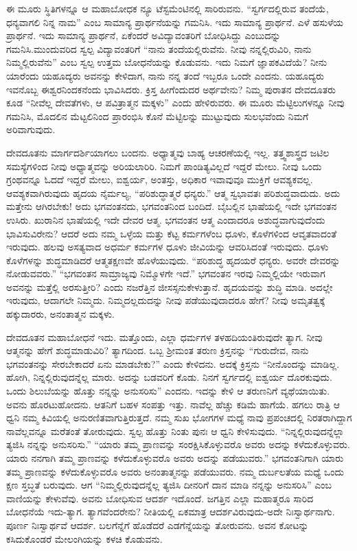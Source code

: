 ಈ ಮೂರು ಸ್ಥಿತಿಗಳನ್ನೂ ಆ ಮಹಾಬೋಧಕ ನ್ಯೂ ಟೆಸ್ಟಮೆಂಟಿನಲ್ಲಿ ಸಾರಿರುವನು. “ಸ್ವರ್ಗದಲ್ಲಿರುವ ತಂದೆಯೆ, ಧನ್ಯವಾಗಲಿ ನಿನ್ನ ನಾಮ” ಎಂಬ ಸಾಮಾನ್ಯ ಪ್ರಾರ್ಥನೆಯನ್ನು ಗಮನಿಸಿ. ಇದು ಸಾಮಾನ್ಯ ಪ್ರಾರ್ಥನೆ. ಎಳೆ ಹಸುಳೆಯ ಪ್ರಾರ್ಥನೆ. ಇದು ಸಾಮಾನ್ಯ ಪ್ರಾರ್ಥನೆ, ಏಕೆಂದರೆ ಅವಿದ್ಯಾವಂತರಿಗೆ ಬೋಧಿಸಿದ್ದು ಎಂಬುದನ್ನು ಗಮನಿಸಿ.\break ಮುಂದುವರಿದ ಸ್ವಲ್ಪ ವಿದ್ಯಾವಂತರಿಗೆ “ನಾನು ತಂದೆಯಲ್ಲಿರುವೆನು. ನೀವು ನನ್ನಲ್ಲಿರುವಿರಿ, ನಾನು ನಿಮ್ಮಲ್ಲಿರುವೆನು” ಎಂಬ ಸ್ವಲ್ಪ ಉತ್ತಮ ಬೋಧನೆಯನ್ನು ಕೊಡುವನು. ಇದು ನಿಮಗೆ ಜ್ಞಾಪಕವಿದೆಯೆ? ನೀನು ಯಾರೆಂದು ಯಹೂದ್ಯರು ಅವನನ್ನು ಕೇಳಿದಾಗ, ನಾನು ನನ್ನ ತಂದೆ ಇಬ್ಬರೂ ಒಂದೇ ಎಂದನು. ಯಹೂದ್ಯರು ಇವನೊಬ್ಬ ಈಶ್ವರನಿಂದಕನೆಂದು ಭಾವಿಸಿದರು. ಕ್ರಿಸ್ತ ಹೀಗೆಂದುದರ ಅರ್ಥವೇನು? ನಿಮ್ಮ ಪುರಾತನ ದೇವದೂತರು ಕೂಡ “ನೀವೆಲ್ಲ ದೇವತೆಗಳು, ಆ ಪವಿತ್ರಾತ್ಮನ ಮಕ್ಕಳು” ಎಂದು ಹೇಳಿರುವರು. ಈ ಮೂರು ಮೆಟ್ಟಿಲುಗಳನ್ನೂ ನೀವು ಗಮನಿಸಿ, ಮೊದಲಿನ ಮೆಟ್ಟಲಿನಿಂದ ಪ್ರಾರಂಭಿಸಿ ಕೊನೆ ಮೆಟ್ಟಿಲನ್ನು ಮುಟ್ಟುವುದು ಸುಲಭವೆಂದು ನಿಮಗೆ ಅರಿವಾಗುವುದು.

ದೇವದೂತನು ಮಾರ್ಗದರ್ಶಿಯಾಗಲು ಬಂದನು. ಅಧ್ಯಾತ್ಮವು ಬಾಹ್ಯ ಆಚರಣೆಯಲ್ಲಿ ಇಲ್ಲ. ತತ್ತ್ವಶಾಸ್ತ್ರದ ಜಟಿಲ ಸಮಸ್ಯೆಗಳಿಂದ ನೀವು ಅಧ್ಯಾತ್ಮವನ್ನು ಅರಿಯಲಾರಿರಿ. ನಿಮಗೆ ಪಾಂಡಿತ್ಯವಿಲ್ಲದೆ ಇದ್ದರೆ ಮೇಲು. ನೀವು ಒಂದು ಗ್ರಂಥವನ್ನೂ ಓದದೆ ಇದ್ದರೆ ಮೇಲು, ಐಶ್ವರ್ಯ, ಅಂತಸ್ತು, ಅಧಿಕಾರ ಇವಾವುವೂ ಮುಕ್ತಿಗೆ ಆವಶ್ಯಕವಲ್ಲ. ಆವಶ್ಯಕ\-ವಾಗಿರುವುದು ಹೃದಯ ನೈರ್ಮಲ್ಯ, “ಪರಿಶುದ್ಧಾತ್ಮರೆ ಧನ್ಯರು.” ಆತ್ಮ ಸ್ವಭಾವತಃ ಪರಿಶುದ್ಧ\-ವಾದುದು. ಅದು ಮತ್ತೇನು ಆಗಿರಬೇಕು! ಅದು ಭಗವಂತನದು, ಭಗವಂತನಿಂದ ಬಂದಿದೆ. ಬೈಬಲ್ಲಿನ ಭಾಷೆಯಲ್ಲಿ ಇದೇ ಭಗವಂತನ ಉಸಿರು. ಖುರಾನಿನ ಭಾಷೆಯಲ್ಲಿ ಇದೇ ದೇವರ ಆತ್ಮ. ಭಗವಂತನ ಆತ್ಮ ಎಂದಾದರೂ ಅಶುದ್ಧವಾಗುವುದೆಂದು ಭಾವಿಸುವಿ\-ರೇನು? ಆದರೆ ಅದು ನಮ್ಮ ಒಳ್ಳೆಯ ಮತ್ತು ಕೆಟ್ಟ ಕರ್ಮಗಳೆಂಬ ಧೂಳು, ಕೊಳೆಗಳಿಂದ ಆವೃತ\-ವಾದಂತೆ ಇರುವುದು. ಹಲವು ಅಸತ್ಯವಾದ ಅಧರ್ಮ ಕರ್ಮಗಳ ಧೂಳು ಜೀವಿಯನ್ನು ಆವರಿಸಿದಂತೆ ಇರುವುದು. ಧೂಳು ಕೊಳೆಗಳನ್ನು ಶುದ್ಧಮಾಡಿದರೆ ಆತ್ಮ\break ತಕ್ಷಣವೇ ಹೊಳೆಯುವುದು. “ಪರಿಶುದ್ಧ ಹೃದಯರೆ ಧನ್ಯರು. ಅವರೇ ದೇವರನ್ನು ನೋಡುವವರು.” “ಭಗವಂತನ ಸಾಮ್ರಾಜ್ಯವು ನಿಮ್ಮೊಳಗೇ ಇದೆ.” ಭಗವಂತನ ಇರವು ನಿಮ್ಮಲ್ಲಿಯೇ ಇರುವಾಗ ಅವನನ್ನು ಮತ್ತೆಲ್ಲಿ ಅರಸುತ್ತೀರಿ? ಎಂದು ನಜರೆತ್ತಿನ ಜೀಸಸ್ಸನು\break ಕೇಳುತ್ತಾನೆ. ಹೃದಯವನ್ನು ಶುದ್ಧಿ ಮಾಡಿ. ಅದಲ್ಲೇ ಇರುವುದು, ಆದಾಗಲೇ ನಿಮ್ಮದು. ನಿಮ್ಮದಲ್ಲದುದನ್ನು ನೀವು ಪಡೆಯುವುದಾದರೂ ಹೇಗೆ? ನೀವು ಅಮೃತತ್ವಕ್ಕೆ ಹಕ್ಕು\-ದಾರರು, ಅನಂತಾತ್ಮನ ಮಕ್ಕಳು.

ದೇವದೂತನ ಮಹಾಬೋಧನೆ ಇದು. ಮತ್ತೊಂದು, ಎಲ್ಲಾ ಧರ್ಮಗಳ ತಳಹದಿಯಂತಿರುವುದೇ ತ್ಯಾಗ. ನೀವು ಆತ್ಮನನ್ನು ಹೇಗೆ ಶುದ್ಧಮಾಡುವಿರಿ? ತ್ಯಾಗದಿಂದ. ಒಬ್ಬ ಶ‍್ರೀಮಂತ ತರುಣ ಕ್ರಿಸ್ತನನ್ನು “ಗುರುದೇವ, ನಾನು ಭಗವಂತನನ್ನು ಸೇರಬೇಕಾದರೆ ಏನು ಮಾಡಬೇಕು?” ಎಂದು ಕೇಳಿದನು. ಅದಕ್ಕೆ ಕ್ರಿಸ್ತನು “ನೀನೊಂದನ್ನು ಮಾಡಿಲ್ಲ. ಹೋಗಿ, ನಿನ್ನಲ್ಲಿರುವುದನ್ನೆಲ್ಲ ಮಾರು. ಅದನ್ನು ಬಡವರಿಗೆ ಕೊಡು. ನಿನಗೆ ಸ್ವರ್ಗದಲ್ಲಿ ಐಶ್ವರ್ಯ ದೊರಕುವುದು. ಒಂದು ಶಿಲುಬೆಯನ್ನು ಹೊತ್ತು ನನ್ನನ್ನು ಅನುಸರಿಸು” ಎಂದನು. ಇದನ್ನು ಕೇಳಿ ಆ ತರುಣನಿಗೆ ವ್ಯಥೆ\-ಯಾಯಿತು. ಅವನು ಹೊರಟುಹೋದನು. ಆತನಿಗೆ ಬಹಳ ಸಂಪತ್ತು ಇತ್ತು. ನಾವೆಲ್ಲ ಹೆಚ್ಚು ಕಡಿಮೆ ಹಾಗೆಯೆ. ಹಗಲು ರಾತ್ರಿ ಆ ಧ್ವನಿ ನಮ್ಮ ಕಿವಿಯಲ್ಲಿ ಅನುರಣಿತವಾಗುತ್ತಿರುತ್ತದೆ. ನಮ್ಮ ಸುಖ ಭೋಗಗಳ ಮಧ್ಯೆ ನಾವು ಪ್ರಪಂಚದಲ್ಲಿ ನಿರತರಾಗಿದ್ದಾಗ ನಾವೆಲ್ಲವನ್ನೂ ಮರೆತಂತೆ ತೋರುವುದು. ಸ್ವಲ್ಪ ಹೊತ್ತು ನಿಂತು ಪುನಃ ಆ ಧ್ವನಿ ಕೇಳಿಸುವುದು. “ನಿನ್ನಲ್ಲಿರುವುದನ್ನೆಲ್ಲಾ ತ್ಯಜಿಸಿ ನನ್ನನ್ನು ಅನುಸರಿಸು.” “ಯಾರು ತಮ್ಮ ಪ್ರಾಣವನ್ನು ಸಂರಕ್ಷಿಸಿಕೊಳ್ಳುವರೊ ಅವರು ಅದನ್ನು ಕಳೆದುಕೊಳ್ಳುವರು. ಯಾರು ನನಗಾಗಿ ತಮ್ಮ ಪ್ರಾಣವನ್ನು ಕಳೆದುಕೊಳ್ಳುವರೊ ಅವರು ಅದನ್ನು ಪಡೆಯುವರು.” ಭಗವಂತನಿಗಾಗಿ ಯಾರು ತಮ್ಮ ಪ್ರಾಣವನ್ನು ಕಳೆದು\-ಕೊಳ್ಳುವರೊ ಅವರು ಅನಂತಾತ್ಮನನ್ನು ಪಡೆಯುವರು. ನಮ್ಮ ದುರ್ಬಲತೆಯ ಮಧ್ಯೆ ಒಂದು ಕ್ಷಣ ಸ್ತಬ್ಧತೆ ಬರುವುದು. ಆಗ “ನಿಮ್ಮಲ್ಲಿರುವುದನ್ನೆಲ್ಲ ತ್ಯಜಿಸಿ ದೀನರಿಗೆ ದಾನ ಮಾಡಿ ನನ್ನನ್ನು ಅನುಸರಿಸಿ” ಎಂಬ ವಾಣಿಯನ್ನು ಕೇಳುವೆವು. ಅವನು ಬೋಧಿಸುವ ಆದರ್ಶ ಇದೊಂದೆ. ಜಗತ್ತಿನ ಎಲ್ಲಾ ಮಹಾತ್ಮರೂ ಸಾರಿದ ಬೋಧನೆಯೆ ಇದು-ತ್ಯಾಗ. ತ್ಯಾಗವೆಂದರೇನು? ನೀತಿಯಲ್ಲಿ ಏಕಮಾತ್ರ ಆದರ್ಶವಿರುವುದು-ಅದೇ ನಿಃಸ್ವಾರ್ಥನಾಗು. ಪೂರ್ಣ ನಿಃಸ್ವಾರ್ಥವೆ ಆದರ್ಶ. ಬಲಗೆನ್ನೆಗೆ ಹೊಡೆದರೆ ಎಡಗೆನ್ನೆಯನ್ನು ತೋರುವನು. ಅವನ ಕೋಟನ್ನು ಕಸಿದುಕೊಂಡರೆ ಮೇಲಂಗಿಯನ್ನು ಕಳಚಿ ಕೊಡುವನು.

